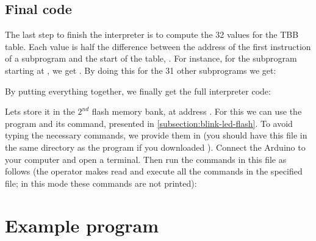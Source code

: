 \subsection{Final code}\label{subsection:interpreter-code}

The last step to finish the interpreter is to compute the 32 values for the
TBB table. Each value is half the difference between the address of the first
instruction of a subprogram and the start of the table,
. For
instance, for the  subprogram starting at
, we get
. By doing this
for the 31 other subprograms we get:


\noindent By putting everything together, we finally get the full
interpreter code:


Lets store it in the $2^{nd}$ flash memory bank, at address
. For this we can use the  program
and its  command, presented in \cref{subsection:blink-led-flash}.
To avoid typing the  necessary 
commands, we provide them in  (you should have this
file in the same directory as the  program if you
downloaded ). Connect the Arduino to your computer and
open a terminal. Then run the commands in this file as follows (the \code{<}
operator makes  read and execute all the commands in the
specified file; in this mode these commands are not printed):


\section{Example program}\label{section:blink-led-bytecode}

